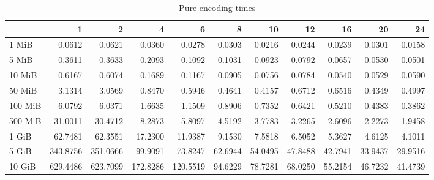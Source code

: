 \begin{table}[!h]
	\caption{Pure encoding times}
	\begin{tabular}{lrrrrrrrrrr}
		\toprule
		\diagbox{File sizes }{Threads}  &        1  &        2  &        4  &        6  &       8  &       10 &       12 &       16 &       20 &       24 \\
		\midrule
		1 MiB   &    0.0612 &    0.0621 &    0.0360 &    0.0278 &   0.0303 &   0.0216 &   0.0244 &   0.0239 &   0.0301 &   0.0158 \\
		5 MiB   &    0.3611 &    0.3633 &    0.2093 &    0.1092 &   0.1031 &   0.0923 &   0.0792 &   0.0657 &   0.0530 &   0.0501 \\
		10 MiB  &    0.6167 &    0.6074 &    0.1689 &    0.1167 &   0.0905 &   0.0756 &   0.0784 &   0.0540 &   0.0529 &   0.0590 \\
		50 MiB  &    3.1314 &    3.0569 &    0.8470 &    0.5946 &   0.4641 &   0.4157 &   0.6712 &   0.6516 &   0.4349 &   0.4997 \\
		100 MiB &    6.0792 &    6.0371 &    1.6635 &    1.1509 &   0.8906 &   0.7352 &   0.6421 &   0.5210 &   0.4383 &   0.3862 \\
		500 MiB &   31.0011 &   30.4712 &    8.2873 &    5.8097 &   4.5192 &   3.7783 &   3.2265 &   2.6096 &   2.2273 &   1.9458 \\
		1 GiB   &   62.7481 &   62.3551 &   17.2300 &   11.9387 &   9.1530 &   7.5818 &   6.5052 &   5.3627 &   4.6125 &   4.1011 \\
		5 GiB   &  343.8756 &  351.0666 &   99.9091 &   73.8247 &  62.6944 &  54.0495 &  47.8488 &  42.7941 &  33.9437 &  29.9516 \\
		10 GiB  &  629.4486 &  623.7099 &  172.8286 &  120.5519 &  94.6229 &  78.7281 &  68.0250 &  55.2154 &  46.7232 &  41.4739 \\
		\bottomrule
	\end{tabular}
\end{table}
